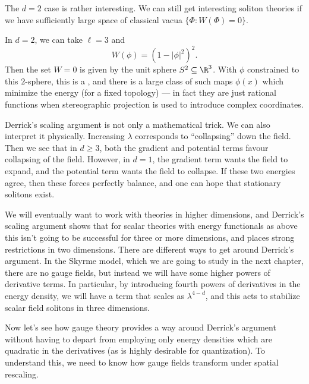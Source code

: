 \documentclass[a4paper]{article}
\begin{document}
The $d = 2$ case is rather interesting. We can still get interesting soliton theories if we have sufficiently large space of classical vacua $\{\Phi: W(\Phi) = 0\}$.
\begin{eg}
  In $d = 2$, we can take $\ell = 3$ and
  \[
    W(\phi) = (1 - |\phi|^2)^2.
  \]
  Then the set $W = 0$ is given by the unit sphere $S^2 \subseteq \R^3$. With $\phi$ constrained to this $2$-sphere, this is a , and there is a large class of such maps $\phi(x)$ which minimize the energy (for a fixed topology) --- in fact they are just rational functions when stereographic projection is used to introduce complex coordinates.
\end{eg}

Derrick's scaling argument is not only a mathematical trick. We can also interpret it physically. Increasing $\lambda$ corresponds to ``collapsing'' down the field. Then we see that in $d \geq 3$, both the gradient and potential terms favour collapsing of the field. However, in $d = 1$, the gradient term wants the field to expand, and the potential term wants the field to collapse. If these two energies agree, then these forces perfectly balance, and one can hope that stationary solitons exist.

We will eventually want to work with theories in higher dimensions, and Derrick's scaling argument shows that for scalar theories with energy functionals as above this isn't going to be successful for three or more dimensions, and places strong restrictions in two dimensions. There are different ways to get around Derrick's argument. In the Skyrme model, which we are going to study in the next chapter, there are no gauge fields, but instead we will have some higher powers of derivative terms. In particular, by introducing fourth powers of derivatives in the energy density, we will have a term that scales as $\lambda^{4 - d}$, and this acts to stabilize scalar field solitons in three dimensions.

Now let's see how gauge theory provides a way around Derrick's argument without having to depart from employing only energy densities which are quadratic in the derivatives (as is highly desirable for quantization). To understand this, we need to know how gauge fields transform under spatial rescaling.
\end{document}
